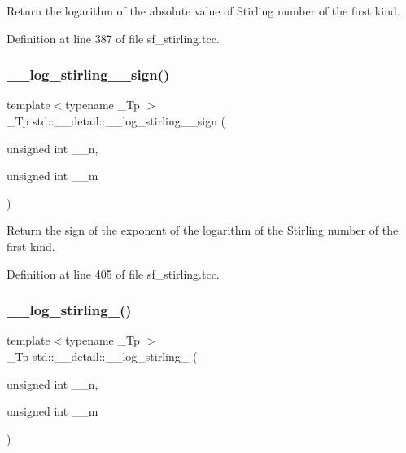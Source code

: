 Return the logarithm of the absolute value of Stirling number of the first kind. 

Definition at line 387 of file sf\+\_\+stirling.\+tcc.

\mbox{\label{namespacestd_1_1____detail_af804ed0eecfca835d1338a48892460b0}} 
\subsubsection{\texorpdfstring{\+\_\+\+\_\+log\+\_\+stirling\+\_\+\_\+sign()}{\_\_log\_stirling\_1\_sign()}}
{\footnotesize\ttfamily template$<$typename \+\_\+\+Tp $>$ \\
\+\_\+\+Tp std\+::\+\_\+\+\_\+detail\+::\+\_\+\+\_\+log\+\_\+stirling\+\_\+\_\+sign (\begin{DoxyParamCaption}\item[{unsigned int}]{\+\_\+\+\_\+n,  }\item[{unsigned int}]{\+\_\+\+\_\+m }\end{DoxyParamCaption})\hspace{0.3cm}{\ttfamily [inline]}}

Return the sign of the exponent of the logarithm of the Stirling number of the first kind. 

Definition at line 405 of file sf\+\_\+stirling.\+tcc.

\mbox{\label{namespacestd_1_1____detail_a7ba1fde0547236676d579b6405f2fb25}} 
\subsubsection{\texorpdfstring{\+\_\+\+\_\+log\+\_\+stirling\+\_()}{\_\_log\_stirling\_2()}}
{\footnotesize\ttfamily template$<$typename \+\_\+\+Tp $>$ \\
\+\_\+\+Tp std\+::\+\_\+\+\_\+detail\+::\+\_\+\+\_\+log\+\_\+stirling\+\_ (\begin{DoxyParamCaption}\item[{unsigned int}]{\+\_\+\+\_\+n,  }\item[{unsigned int}]{\+\_\+\+\_\+m }\end{DoxyParamCaption})}

